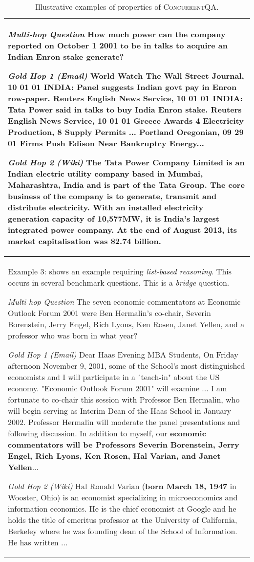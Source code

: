 \documentclass{article}
\newcommand{\blue}[1]{{\color{blue}#1}}
\newcommand{\datasetname}{\textsc{ConcurrentQA}\xspace}
\begin{document}
\begin{table*}[t]
\begin{tabular}{p{15cm}}
\textit{Multi-hop Question} How much power can the company reported on October 1 2001 to be in talks to acquire an Indian Enron stake generate?\newline

\textit{Gold Hop 1 (Email)} World Watch The Wall Street Journal, 10 01 01 INDIA: Panel suggests Indian govt pay in Enron row-paper. Reuters English News Service, 10 01 01 INDIA: \textbf{Tata Power said in talks to buy India Enron stake}. Reuters English News Service, 10 01 01 Greece Awards 4 Electricity Production, 8 Supply Permits ... Portland Oregonian, 09 29 01 Firms Push Edison Near Bankruptcy Energy...\newline

\textit{Gold Hop 2 (Wiki)} The Tata Power Company Limited is an Indian electric utility company based in Mumbai, Maharashtra, India and is part of the Tata Group. The core business of the company is to generate, transmit and distribute electricity. With an installed \textbf{electricity generation capacity of 10,577MW}, it is India's largest integrated power company. At the end of August 2013, its market capitalisation was \$2.74 billion.\\
\midrule
\blue{Example 3: shows an example requiring \textit{list-based reasoning}. This occurs in several benchmark questions. This is a \textit{bridge} question.} \newline

\textit{Multi-hop Question} The seven economic commentators at Economic Outlook Forum 2001 were Ben Hermalin's co-chair, Severin Borenstein, Jerry Engel, Rich Lyons, Ken Rosen, Janet Yellen, and a professor who was born in what year?\newline

\textit{Gold Hop 1 (Email)} Dear Haas Evening MBA Students, On Friday afternoon November 9, 2001, some of the School's most distinguished economists and I will participate in a "teach-in" about the US economy. "Economic Outlook Forum 2001" will examine ... I am fortunate to co-chair this session with Professor Ben Hermalin, who will begin serving as Interim Dean of the Haas School in January 2002. Professor Hermalin will moderate the panel presentations and following discussion. In addition to myself, our \textbf{economic commentators will be Professors Severin Borenstein, Jerry Engel, Rich Lyons, Ken Rosen, Hal Varian, and Janet Yellen}...\newline

\textit{Gold Hop 2 (Wiki)} Hal Ronald Varian (\textbf{born March 18, 1947} in Wooster, Ohio) is an economist specializing in microeconomics and information economics. He is the chief economist at Google and he holds the title of emeritus professor at the University of California, Berkeley where he was founding dean of the School of Information. He has written ...
\\
\bottomrule
\end{tabular}
\caption{Illustrative examples of properties of \datasetname.}
\label{tab:additional_examples}
\end{table*}
\end{document}
